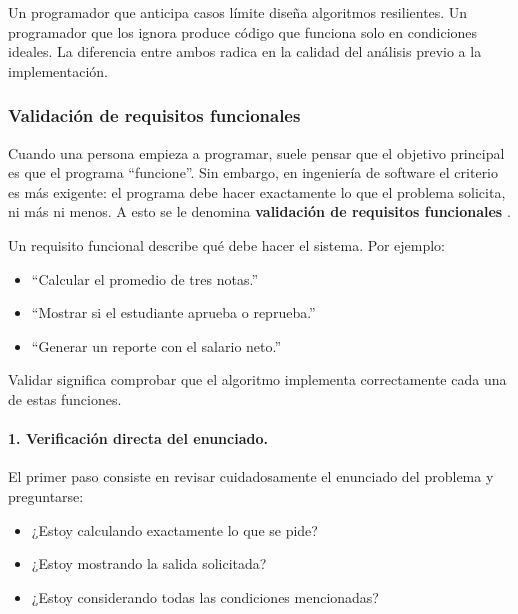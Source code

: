 \documentclass[12pt,twoside]{book}
\begin{document}
						\bigskip
						
						Un programador que anticipa casos límite diseña algoritmos resilientes. Un programador que los ignora produce código que funciona solo en condiciones ideales. La diferencia entre ambos radica en la calidad del análisis previo a la implementación.

		
					\subsubsection{Validación de requisitos funcionales}
						\noindent
						Cuando una persona empieza a programar, suele pensar que el objetivo principal es que el programa “funcione”. Sin embargo, en ingeniería de software el criterio es más exigente: el programa debe hacer exactamente lo que el problema solicita, ni más ni menos. A esto se le denomina \textbf{validación de requisitos funcionales} \cite{Pressman2019Software,Sommerville2015Software}.
						
						Un requisito funcional describe qué debe hacer el sistema. Por ejemplo:
						
						\begin{itemize}
							\item “Calcular el promedio de tres notas.”
							\item “Mostrar si el estudiante aprueba o reprueba.”
							\item “Generar un reporte con el salario neto.”
						\end{itemize}
						
						\noindent
						Validar significa comprobar que el algoritmo implementa correctamente cada una de estas funciones.
						
						\paragraph{1. Verificación directa del enunciado.} El primer paso consiste en revisar cuidadosamente el enunciado del problema y preguntarse:
						
						\begin{itemize}
							\item ¿Estoy calculando exactamente lo que se pide?
							\item ¿Estoy mostrando la salida solicitada?
							\item ¿Estoy considerando todas las condiciones mencionadas?
						\end{itemize}
						
\end{document}
